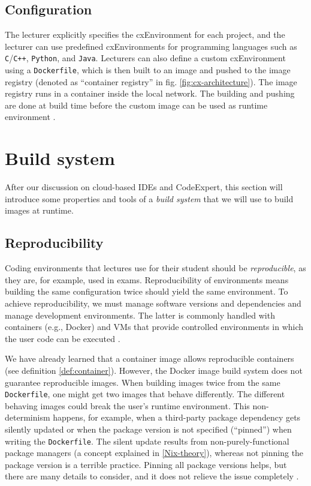 \subsection{Configuration}\label{CX-configuration}
The lecturer explicitly specifies the cxEnvironment for each project, and the lecturer can use predefined cxEnvironments for programming languages such as \verb|C|/\verb|C++|, \verb|Python|, and \verb|Java|. Lecturers can also define a custom cxEnvironment using a \verb|Dockerfile|, which is then built to an image and pushed to the image registry (denoted as ``container registry'' in fig. \ref{fig:cx-architecture}). The image registry runs in a container inside the local network. The building and pushing are done at build time before the custom image can be used as runtime environment \cite{CXDocs}.

\section{Build system}
After our discussion on cloud-based IDEs and CodeExpert, this section will introduce some properties and tools of a \emph{build system} that we will use to build images at runtime. 

\subsection{Reproducibility}\label{reproducibility}
Coding environments that lectures use for their student should be \emph{reproducible}, as they are, for example, used in exams. Reproducibility of environments means building the same configuration twice should yield the same environment. To achieve reproducibility, we must manage software versions and dependencies and manage development environments. The latter is commonly handled with containers (e.g., Docker) and VMs that provide controlled environments in which the user code can be executed \cite{bedo2010}. 

We have already learned that a container image allows reproducible containers (see definition \ref{def:container}). However, the Docker image build system does not guarantee reproducible images. When building images twice from the same \verb|Dockerfile|, one might get two images that behave differently. The different behaving images could break the user's runtime environment. This non-determinism happens, for example, when a third-party package dependency gets silently updated or when the package version is not specified (``pinned'') when writing the \verb|Dockerfile|. The silent update results from non-purely-functional package managers (a concept explained in \ref{Nix-theory}), whereas not pinning the package version is a terrible practice. Pinning all package versions helps, but there are many details to consider, and it does not relieve the issue completely \cite{OHearn}.

